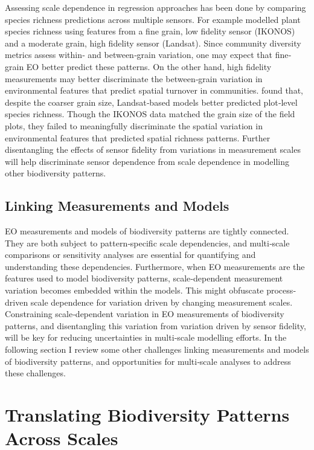 Assessing scale dependence in regression approaches has been done by comparing species richness predictions across multiple sensors. For example \cite{Nagendra2010-cc} modelled plant species richness using features from a fine grain, low fidelity sensor (IKONOS) and a moderate grain, high fidelity sensor (Landsat). Since community diversity metrics assess within‐ and between‐grain variation, one may expect that fine‐grain EO better predict these patterns. On the other hand, high fidelity measurements may better discriminate the between‐grain variation in environmental features that predict spatial turnover in communities. \cite{Nagendra2010-cc} found that, despite the coarser grain size, Landsat‐based models better predicted plot‐level species richness. Though the IKONOS data matched the grain size of the field plots, they failed to meaningfully discriminate the spatial variation in environmental features that predicted spatial richness patterns. Further disentangling the effects of sensor fidelity from variations in measurement scales will help discriminate sensor dependence from scale dependence in modelling other biodiversity patterns.

\subsection{Linking Measurements and Models}

EO measurements and models of biodiversity patterns are tightly connected. They are both subject to pattern‐specific scale dependencies, and multi‐scale comparisons or sensitivity analyses are essential for quantifying and understanding these dependencies. Furthermore, when EO measurements are the features used to model biodiversity patterns, scale‐dependent measurement variation becomes embedded within the models. This might obfuscate process‐driven scale dependence for variation driven by changing measurement scales. Constraining scale‐dependent variation in EO measurements of biodiversity patterns, and disentangling this variation from variation driven by sensor fidelity, will be key for reducing uncertainties in multi‐scale modelling efforts. In the following section I review some other challenges linking measurements and models of biodiversity patterns, and opportunities for multi‐scale analyses to address these challenges.

\section{Translating Biodiversity Patterns Across Scales}

